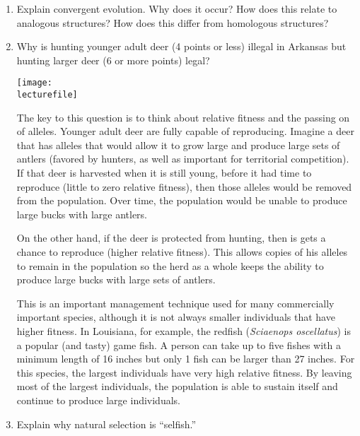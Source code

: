 \documentclass[letterpaper]{tufte-handout}
\newcommand\lecturefile{163_lecture06_fullsize}
\begin{document}
\begin{enumerate}

	\item Explain convergent evolution. Why does it occur? How does this relate to analogous structures? How does this differ from homologous structures?

	\item	Why is hunting younger adult deer (4 points or less) illegal in Arkansas but hunting larger deer (6 or more points) legal?  
	
	\begin{marginfigure}[0.5in]
		\texttt{[image: \\lecturefile]}
	\end{marginfigure}
	
	The key to this question is to think about relative fitness and the passing on of alleles.  Younger adult deer are fully capable of reproducing. Imagine a deer that has alleles that would allow it to grow large and produce large sets of antlers (favored by hunters, as well as important for territorial competition). If that deer is harvested when it is still young, before it had time to reproduce (little to zero relative fitness), then those alleles would be removed from the population. Over time, the population would be unable to produce large bucks with large antlers.	
	
	On the other hand, if the deer is protected from hunting, then is gets a chance to reproduce (higher relative fitness). This allows copies of his alleles to remain in the population so the herd as a whole keeps the ability to produce large bucks with large sets of antlers.
	
	This is an important management technique used for many commercially important species, although it is not always smaller individuals that have higher fitness. In Louisiana, for example, the redfish (\textit{Sciaenops oscellatus}) is a popular (and tasty) game fish. A person can take up to five fishes with a minimum length of 16 inches but only 1 fish can be larger than 27 inches. For this species, the largest individuals have very high relative fitness. By leaving most of the largest individuals, the population is able to sustain itself and continue to produce large individuals.
	

	\item	Explain why natural selection is ``selfish.''


\end{enumerate}
\end{document}
